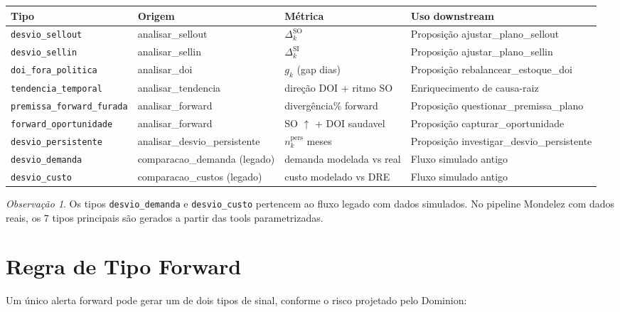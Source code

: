 \documentclass[a4paper, 12pt]{report}
\theoremstyle{definition}
\theoremstyle{remark}
\newtheorem{observacao}{Observa\c{c}\~ao}[chapter]
\begin{document}
\begin{center}
\begin{tabular}{lllp{4.5cm}}
  \toprule
  \textbf{Tipo} & \textbf{Origem} & \textbf{M\'etrica} & \textbf{Uso downstream} \\
  \midrule
  \texttt{desvio\_sellout} & analisar\_sellout & $\Delta^{\text{SO}}_k$ & Proposi\c{c}\~ao ajustar\_plano\_sellout \\
  \texttt{desvio\_sellin} & analisar\_sellin & $\Delta^{\text{SI}}_k$ & Proposi\c{c}\~ao ajustar\_plano\_sellin \\
  \texttt{doi\_fora\_politica} & analisar\_doi & $g_k$ (gap dias) & Proposi\c{c}\~ao rebalancear\_estoque\_doi \\
  \texttt{tendencia\_temporal} & analisar\_tendencia & dire\c{c}\~ao DOI + ritmo SO & Enriquecimento de causa-raiz \\
  \texttt{premissa\_forward\_furada} & analisar\_forward & diverg\^encia\% forward & Proposi\c{c}\~ao questionar\_premissa\_plano \\
  \texttt{forward\_oportunidade} & analisar\_forward & SO $\uparrow$ + DOI saudavel & Proposi\c{c}\~ao capturar\_oportunidade \\
  \texttt{desvio\_persistente} & analisar\_desvio\_persistente & $n^{\text{pers}}_k$ meses & Proposi\c{c}\~ao investigar\_desvio\_persistente \\
  \texttt{desvio\_demanda} & comparacao\_demanda (legado) & demanda modelada vs real & Fluxo simulado antigo \\
  \texttt{desvio\_custo} & comparacao\_custos (legado) & custo modelado vs DRE & Fluxo simulado antigo \\
  \bottomrule
\end{tabular}
\end{center}

\begin{observacao}
  Os tipos \texttt{desvio\_demanda} e \texttt{desvio\_custo} pertencem ao
  fluxo legado com dados simulados. No pipeline Mondelez com dados reais,
  os 7 tipos principais s\~ao gerados a partir das tools parametrizadas.
\end{observacao}


\section{Regra de Tipo Forward}

Um \'unico alerta forward pode gerar um de dois tipos de sinal,
conforme o risco projetado pelo Dominion:
\end{document}
